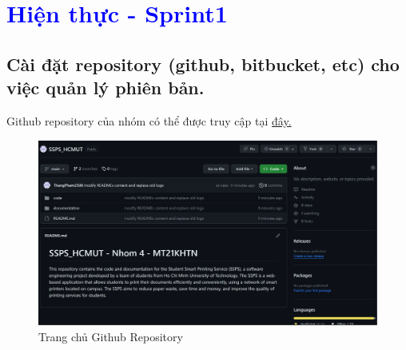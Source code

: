 \section{\textcolor{blue}{Hiện thực - Sprint1}} 
\subsection{Cài đặt repository (github, bitbucket, etc) cho việc quản lý phiên bản.}
Github repository của nhóm có thể được truy cập tại \href{https://github.com/ThangPham2508/SSPS\_HCMUT}{đây.}
\begin{figure}[H]
    \begin{center}
        \includegraphics[width=1\textwidth]{Images/Github/github-main.png}
        \caption{Trang chủ Github Repository}
    \end{center}
\end{figure}
